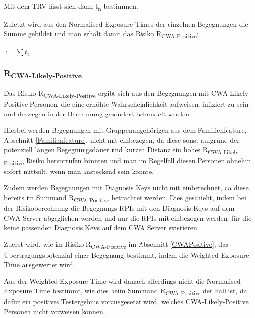 \documentclass[conference,compsoc]{IEEEtran}
\begin{document}



\centerline{\text{ }}

Mit dem TRV lässt sich dann t\textsubscript{n} bestimmen.

Zuletzt wird aus den Normalised Exposure Times der einzelnen Begegnungen die Summe gebildet und man erhält damit das Risiko R\textsubscript{CWA-Positive}:

\centerline{\text{ }}
\centerline{  $ := \sum t_n$}
\centerline{\text{ }}

\subsubsection{R\textsubscript{CWA-Likely-Positive}}
\label{CWALikelyPositive}

Das Risiko R\textsubscript{CWA-Likely-Positive} ergibt sich aus den Begegnungen mit CWA-Likely-Positive Personen, 
die eine erhöhte Wahrscheinlichkeit aufweisen, infiziert zu sein und deswegen in der Berechnung gesondert behandelt werden. 

Hierbei werden Begegnungen mit Gruppenangehörigen aus dem Familienfeature, Abschnitt \ref{Familienfeature}, nicht mit einbezogen, 
da diese sonst aufgrund der potenziell langen Begegnungsdauer und kurzen Distanz ein hohes R\textsubscript{CWA-Likely-Positive} Risiko hervorrufen könnten und 
man im Regelfall diesen Personen ohnehin sofort mitteilt, wenn man ansteckend sein könnte. 

Zudem werden Begegnungen mit Diagnosis Keys nicht mit einberechnet, da diese bereits im Summand R\textsubscript{CWA-Positive} betrachtet werden. 
Dies geschieht, indem bei der Risikoberechnung die Begegnungs RPIs mit den Diagnosis Keys auf dem CWA Server abgeglichen werden und nur die RPIs mit einbezogen werden, 
für die keine passenden Diagnosis Keys auf dem CWA Server existieren.

Zuerst wird, wie im Risiko R\textsubscript{CWA-Positive} im Abschnitt \ref{CWAPositive}, das Übertragungspotenzial einer Begegnung bestimmt, 
indem die Weighted Exposure Time ausgewertet wird. 

Aus der Weighted Exposure Time wird danach allerdings nicht die Normalised Exposure Time bestimmt, wie dies beim Summand R\textsubscript{CWA-Positive} der Fall ist, 
da dafür ein positives Testergebnis vorausgesetzt wird, welches CWA-Likely-Positive Personen nicht vorweisen können.
\end{document}
